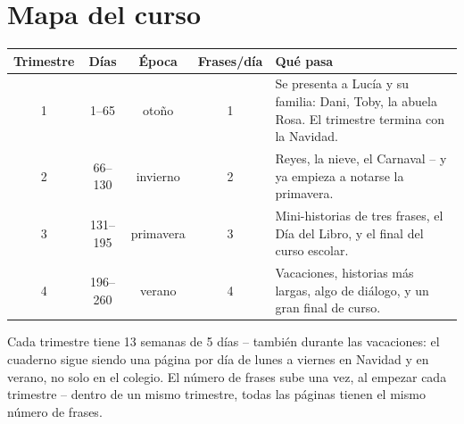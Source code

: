 \section*{Mapa del curso}

\begin{center}
\renewcommand{\arraystretch}{1.4}
\begin{tabularx}{\linewidth}{@{}c c c c X@{}}
\toprule
\textbf{Trimestre} & \textbf{Días} & \textbf{Época} & \textbf{Frases/día} & \textbf{Qué pasa} \\
\midrule
1 & 1--65   & otoño & 1 & Se presenta a Lucía y su familia: Dani, Toby,
la abuela Rosa. El trimestre termina con la Navidad. \\
2 & 66--130 & invierno & 2 & Reyes, la nieve, el Carnaval -- y ya
empieza a notarse la primavera. \\
3 & 131--195 & primavera & 3 & Mini-historias de tres frases, el Día
del Libro, y el final del curso escolar. \\
4 & 196--260 & verano & 4 & Vacaciones, historias más largas, algo de
diálogo, y un gran final de curso. \\
\bottomrule
\end{tabularx}
\end{center}

\vspace{6mm}
Cada trimestre tiene 13 semanas de 5 días -- también durante las
vacaciones: el cuaderno sigue siendo una página por día de lunes a
viernes en Navidad y en verano, no solo en el colegio. El número de
frases sube una vez, al empezar cada trimestre -- dentro de un mismo
trimestre, todas las páginas tienen el mismo número de frases.
\newpage
